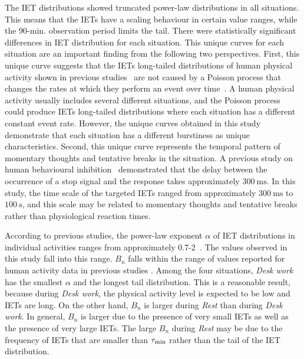 \documentclass{bmcart}
\begin{document}
The IET distributions showed truncated power-law distributions in all situations. This means that the IETs have a scaling behaviour in certain value ranges, while the 90-min. observation period limits the tail.
There were statistically significant differences in IET distribution for each situation.
This unique curves for each situation are an important finding from the following two perspectives. First, this unique curve suggests that the IETs long-tailed distributions of human physical activity shown in previous studies~\cite{PhysRevLett.99.138103, PICOLI2022127160, PhysRevE.102.012307} are not caused by a Poisson process that changes the rates at which they perform an event over time~\cite{HIDALGOR2006877}. A human physical activity usually includes several different situations, and the Poisson process could produce IETs long-tailed distributions where each situation has a different constant event rate. However, the unique curves obtained in this study demonstrate that each situation has a different burstiness as unique characteristics. Second, this unique curve represents the temporal pattern of momentary thoughts and tentative breaks in the situation. A previous study on human behavioural inhibition~\cite{logan1984ability} demonstrated that the delay between the occurrence of a stop signal and the response takes approximately $300~\si{\milli\second}$. In this study, the time scale of the targeted IETs ranged from approximately $300~\si{\milli\second}$ to $100~\si{\second}$, and this scale may be related to momentary thoughts and tentative breaks rather than physiological reaction times.

According to previous studies, the power-law exponent $\alpha$ of IET distributions in individual activities ranges from approximately 0.7-2~\cite{karsai2018bursty}. The values observed in this study fall into this range. $B_n$ falls within the range of values reported for human activity data in previous studies \cite{Goh_2008}. 
Among the four situations, \textit{Desk work} has the smallest $\alpha$ and the longest tail distribution. This is a reasonable result, because during \textit{Desk work}, the physical activity level is expected to be low and IETs are long. On the other hand, $B_n$ is larger during \textit{Rest} than during \textit{Desk work}. In general, $B_n$ is larger due to the presence of very small IETs as well as the presence of very large IETs. The large $B_n$ during \textit{Rest} may be due to the frequency of IETs that are smaller than $\tau_{\rm min}$ rather than the tail of the IET distribution.
\end{document}
